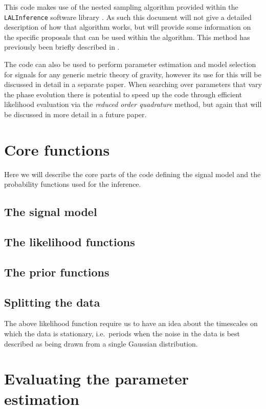 \documentclass[aps,prd,showpacs,superscriptaddress,twocolumn,preprintnumbers,altaffilletter]{revtex4-1}
\newcommand{\lalinf}{\texttt{LALInference}\xspace}
\begin{document}
This code makes use of the nested sampling algorithm provided within the \lalinf software library
\citep{2015PhRvD..91d2003V}. As such this document will not give a detailed description of how that
algorithm works, but will provide some information on the specific proposals that can be used within
the algorithm. This method has previously been briefly described in \cite{2012JPhCS.363a2041P}.

The code can also be used to perform parameter estimation and model selection for signals for any generic
metric theory of gravity, however its use for this will be discussed in detail in a separate paper. When
searching over parameters that vary the phase evolution there is potential to speed up the code through
efficient likelihood evaluation via the {\it reduced order quadrature} method, but again that will be
discussed in more detail in a future paper.

\section{Core functions}

Here we will describe the core parts of the code defining the signal model and the probability functions
used for the inference.

\subsection{The signal model}

\subsection{The likelihood functions}

\subsection{The prior functions}

\subsection{Splitting the data}

The above likelihood function require us to have an idea about the timescales on which the data is
stationary, i.e.\ periods when the noise in the data is best described as being drawn from a single
Gaussian distribution.

\section{Evaluating the parameter estimation}
\end{document}

